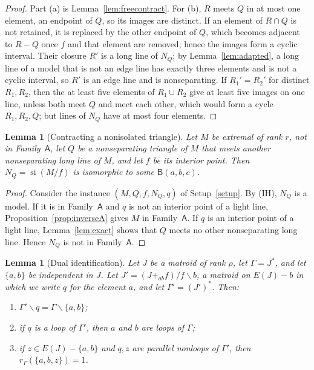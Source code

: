 \documentclass[11pt]{amsart}
\newtheorem{lemma}[theorem]{Lemma}
\theoremstyle{definition}
\theoremstyle{remark}
\numberwithin{equation}{section}
\newcommand{\si}{\operatorname{si}}
\newcommand{\FA}{\mathsf{A}}
\newcommand{\FB}{\mathsf{B}}
\begin{document}
\begin{proof}
Part (a) is Lemma~\ref{lem:freecontract}. For (b), $R$ meets $Q$ in at most one element, an endpoint of $Q$, so its images are distinct. If an element of $R\cap Q$ is not retained, it is replaced by the other endpoint of $Q$, which becomes adjacent to $R-Q$ once $f$ and that element are removed; hence the images form a cyclic interval. Their closure $R'$ is a long line of $N_Q$; by Lemma~\ref{lem:adapted}, a long line of a model that is not an edge line has exactly three elements and is not a cyclic interval, so $R'$ is an edge line and is nonseparating. If $R_1'=R_2'$ for distinct $R_1,R_2$, then the at least five elements of $R_1\cup R_2$ give at least five images on one line, unless both meet $Q$ and meet each other, which would form a cycle $R_1,R_2,Q$; but lines of $N_Q$ have at most four elements.
\end{proof}

\begin{lemma}[Contracting a nonisolated triangle]\label{lem:nonisolated}
Let $M$ be extremal of rank $r$, not in Family~$\FA$, let $Q$ be a nonseparating triangle of $M$ that meets another nonseparating long line of $M$, and let $f$ be its interior point. Then $N_Q=\si(M/f)$ is isomorphic to some $\FB(a,b,c)$.
\end{lemma}

\begin{proof}
Consider the instance $(M,Q,f,N_Q,q)$ of Setup~\ref{setup}. By (IH), $N_Q$ is a model. If it is in Family~$\FA$ and $q$ is not an interior point of a light line, Proposition~\ref{prop:inverseA} gives $M$ in Family~$\FA$. If $q$ is an interior point of a light line, Lemma~\ref{lem:exact} shows that $Q$ meets no other nonseparating long line. Hence $N_Q$ is not in Family~$\FA$.
\end{proof}

\begin{lemma}[Dual identification]\label{lem:dualid}
Let $J$ be a matroid of rank $\rho$, let $\Gamma=J^*$, and let $\{a,b\}$ be independent in $J$. Let $J'=(J+_{ab}f)/f\backslash b$, a matroid on $E(J)-b$ in which we write $q$ for the element $a$, and let $\Gamma'=(J')^*$. Then:
\begin{enumerate}[label=\textup{(\alph*)}]
\item $\Gamma'\backslash q=\Gamma\backslash\{a,b\}$;
\item if $q$ is a loop of $\Gamma'$, then $a$ and $b$ are loops of $\Gamma$;
\item if $z\in E(J)-\{a,b\}$ and $q,z$ are parallel nonloops of $\Gamma'$, then $r_\Gamma(\{a,b,z\})=1$.
\end{enumerate}
\end{lemma}
\end{document}
